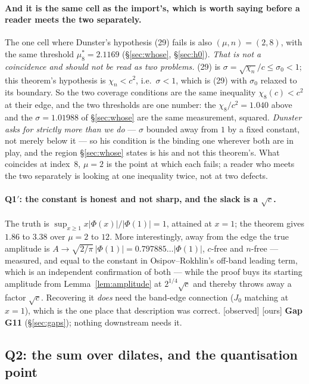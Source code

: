 \documentclass[11pt,a4paper]{article}
\theoremstyle{plain}
\theoremstyle{definition}
\theoremstyle{remark}
\newcommand{\st}[1]{{\normalfont\sffamily\footnotesize[#1]}}
\newcommand{\observed}{\st{observed}}
\newcommand{\ours}{{\normalfont\sffamily\footnotesize[ours]}}
\begin{document}
\paragraph{And it is the same cell as the import's, which is worth saying
before a reader meets the two separately.}  The one cell where Dunster's
hypothesis (29) fails is also $(\mu,n)=(2,8)$, with the same threshold
$\mu^*_8=2.1169$ (\S\ref{sec:whose}, \S\ref{sec:h0}).  \emph{That is not a
coincidence and should not be read as two problems.}  (29) is
$\sigma=\sqrt{\chi_n}/c\le\sigma_0<1$; this theorem's hypothesis is
$\chi_n<c^2$, i.e.\ $\sigma<1$, which is (29) with $\sigma_0$ relaxed to its
boundary.  So the two coverage conditions are the same inequality
$\chi_8(c)<c^2$ at their edge, and the two thresholds are one number: the
$\chi_8/c^2=1.040$ above and the $\sigma=1.01988$ of \S\ref{sec:whose} are the
same measurement, squared.  \emph{Dunster asks for strictly more than we do}
--- $\sigma$ bounded away from $1$ by a fixed constant, not merely below it ---
so his condition is the binding one wherever both are in play, and the region
\S\ref{sec:whose} states is his and not this theorem's.  What coincides at
index~$8$, $\mu=2$ is the point at which each fails; a reader who meets the two
separately is looking at one inequality twice, not at two defects.

\paragraph{Q1$'$: the constant is honest and not sharp, and the slack is a
$\sqrt c$.}  The truth is $\sup_{x\ge1}x|\Phi(x)|/|\Phi(1)|=1$, attained at
$x=1$; the theorem gives $1.86$ to $3.38$ over $\mu=2$ to $12$.  More
interestingly, away from the edge the true amplitude is
$A\to\sqrt{2/\pi}\,|\Phi(1)|=0.797885\ldots|\Phi(1)|$, $c$-free and $n$-free ---
measured, and equal to the constant in Osipov--Rokhlin's off-band leading term,
which is an independent confirmation of both --- while the proof buys its
starting amplitude from Lemma~\ref{lem:amplitude} at $2^{1/4}\sqrt c$ and
thereby throws away a factor $\sqrt c$.  Recovering it \emph{does} need the
band-edge connection ($J_0$ matching at $x=1$), which is the one place that
description was correct.  \observed{} \ours{}  \textbf{Gap G11}
(\S\ref{sec:gaps}); nothing downstream needs it.

\subsection{Q2: the sum over dilates, and the quantisation point}
\label{sec:q2}
\end{document}
